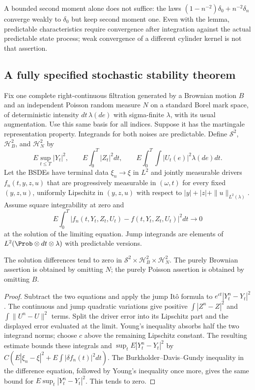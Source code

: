 A bounded second moment alone does not suffice: the laws $(1-n^{-2})\delta_0+n^{-2}\delta_n$ converge weakly to $\delta_0$ but keep second moment one. Even with the lemma, predictable characteristics require convergence after integration against the actual predictable state process; weak convergence of a different cylinder kernel is not that assertion.

\subsection{A fully specified stochastic stability theorem}
Fix one complete right-continuous filtration generated by a Brownian motion $B$ and an independent Poisson random measure $N$ on a standard Borel mark space, of deterministic intensity $dt\,\lambda(de)$ with sigma-finite $\lambda$, with its usual augmentation. Use this same basis for all indices. Suppose it has the martingale representation property. Integrands for both noises are predictable. Define $\mathcal S^2$, $\mathcal H_B^2$, and $\mathcal H_N^2$ by
\[
 E\sup_{t\le T}|Y_t|^2,
 \qquad E\int_0^T|Z_t|^2dt,
 \qquad E\int_0^T\!\int|U_t(e)|^2\lambda(de)dt.
\]
Let the BSDEs have terminal data $\xi_n\to\xi$ in $L^2$ and jointly measurable drivers $f_n(t,y,z,u)$ that are progressively measurable in $(\omega,t)$ for every fixed $(y,z,u)$, uniformly Lipschitz in $(y,z,u)$ with respect to $|y|+|z|+\|u\|_{L^2(\lambda)}$. Assume square integrability at zero and
\[
 E\int_0^T|f_n(t,Y_t,Z_t,U_t)-f(t,Y_t,Z_t,U_t)|^2dt\to0
\]
at the solution of the limiting equation. Jump integrands are elements of $L^2(\Prob\otimes dt\otimes\lambda)$ with predictable versions.

\begin{theorem}
\label{thm:r33-c2-bsde}
The solution differences tend to zero in $\mathcal S^2\times\mathcal H_B^2\times\mathcal H_N^2$. The purely Brownian assertion is obtained by omitting $N$; the purely Poisson assertion is obtained by omitting $B$.
\end{theorem}
\begin{proof}
Subtract the two equations and apply the jump It\^o formula to $e^{ct}|Y_t^n-Y_t|^2$. The continuous and jump quadratic variations give positive $\int|Z^n-Z|^2$ and $\int\|U^n-U\|^2$ terms. Split the driver error into its Lipschitz part and the displayed error evaluated at the limit. Young's inequality absorbs half the two integrand norms; choose $c$ above the remaining Lipschitz constant. The resulting estimate bounds these integrals and $\sup_t E|Y_t^n-Y_t|^2$ by $C(E|\xi_n-\xi|^2+E\int|\delta f_n(t)|^2dt)$. The Burkholder--Davis--Gundy inequality in the difference equation, followed by Young's inequality once more, gives the same bound for $E\sup_t|Y_t^n-Y_t|^2$. This tends to zero.
\end{proof}

